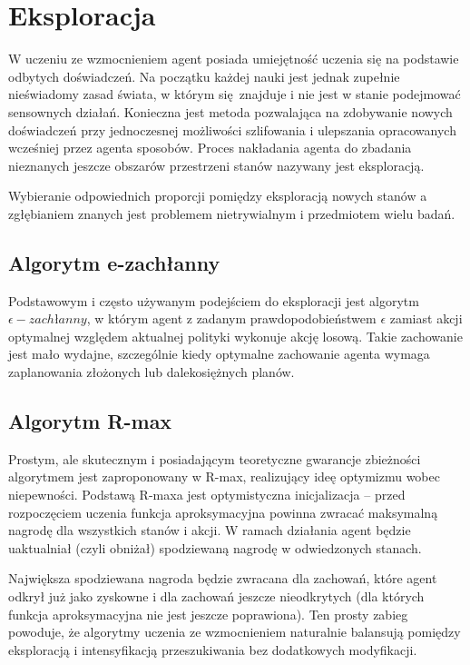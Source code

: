 \section{Eksploracja}
W uczeniu ze wzmocnieniem agent posiada umiejętność uczenia się na podstawie odbytych doświadczeń. Na początku każdej nauki jest jednak zupełnie nieświadomy zasad świata, w którym się znajduje i nie jest w stanie podejmować sensownych działań. Konieczna jest metoda pozwalająca na zdobywanie nowych doświadczeń przy jednoczesnej możliwości szlifowania i ulepszania opracowanych wcześniej przez agenta sposobów. Proces nakładania agenta do zbadania nieznanych jeszcze obszarów przestrzeni stanów nazywany jest eksploracją.

Wybieranie odpowiednich proporcji pomiędzy eksploracją nowych stanów a zgłębianiem znanych jest problemem nietrywialnym i przedmiotem wielu badań.

\subsection{Algorytm e-zachłanny}\label{egreedy}
Podstawowym i często używanym podejściem do eksploracji jest algorytm $\epsilon-zachłanny$, w którym agent z zadanym prawdopodobieństwem $\epsilon$ zamiast akcji optymalnej względem aktualnej polityki wykonuje akcję losową. Takie zachowanie jest mało wydajne, szczególnie kiedy optymalne zachowanie agenta wymaga zaplanowania złożonych lub dalekosiężnych planów.

\subsection{Algorytm R-max}
Prostym, ale skutecznym i posiadającym teoretyczne gwarancje zbieżności algorytmem jest zaproponowany w \cite{brafman02} R-max, realizujący ideę optymizmu wobec niepewności. Podstawą R-maxa jest optymistyczna inicjalizacja – przed rozpoczęciem uczenia funkcja aproksymacyjna powinna zwracać maksymalną nagrodę dla wszystkich stanów i akcji. W ramach działania agent będzie uaktualniał (czyli obniżał) spodziewaną nagrodę w odwiedzonych stanach.

Największa spodziewana nagroda będzie zwracana dla zachowań, które agent odkrył już jako zyskowne i dla zachowań jeszcze nieodkrytych (dla których funkcja aproksymacyjna nie jest jeszcze poprawiona). Ten prosty zabieg powoduje, że algorytmy uczenia ze wzmocnieniem naturalnie balansują pomiędzy eksploracją i intensyfikacją przeszukiwania bez dodatkowych modyfikacji.

